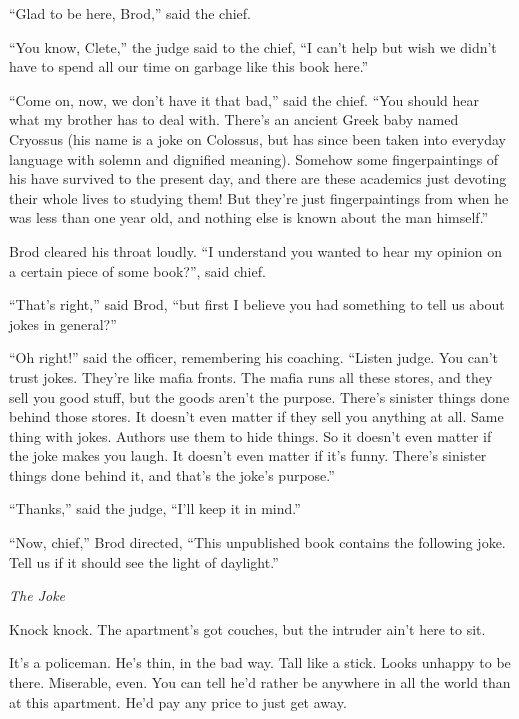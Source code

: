 \documentclass[oneside]{book}
\begin{document}
``Glad to be here, Brod,'' said the chief.

``You know, Clete,'' the judge said to the chief,
``I can't help but wish we didn't have to spend
all our time on garbage like this book here.''

``Come on, now, we don't have it that bad,'' said the chief.
``You should hear what my brother has to deal with.
There's an ancient Greek baby named Cryossus (his name is a joke
on Colossus, but has since been taken into everyday language with
solemn and dignified meaning).  Somehow some fingerpaintings of his
have survived to the present day, and there are these academics
just devoting their whole lives to studying them!  But they're just
fingerpaintings from when he was less than one year old, and
nothing else is known about the man himself.''

Brod cleared his throat loudly.
``I understand you wanted to hear my opinion on a certain
piece of some book?'', said chief.

``That's right,'' said Brod, ``but first I believe you had something to tell us about jokes in general?''

``Oh right!'' said the officer, remembering his coaching.  ``Listen judge.  You can't trust jokes.
They're like mafia fronts.  The mafia runs all these stores, and they sell you good stuff, but the goods aren't
the purpose.  There's sinister things done behind those stores.  It doesn't even matter if they
sell you anything at all.  Same thing with jokes.  Authors use them to hide things.  So it doesn't even matter
if the joke makes you laugh.  It doesn't even matter if it's funny.  There's sinister things done behind it,
and that's the joke's purpose.''

``Thanks,'' said the judge, ``I'll keep it in mind.''

``Now, chief,'' Brod directed, ``This unpublished book contains the following joke.  Tell us if it should
see the light of daylight.''

\vspace{2mm}
\noindent \textit{The Joke}
\vspace{2mm}

Knock knock.  The apartment's got couches, but the intruder ain't here to sit.

It's a policeman.  He's thin, in the bad way.
Tall like a stick.  Looks unhappy to be there.  Miserable, even.  You can tell he'd
rather be anywhere in all the world than at this apartment.  He'd pay any price to just
get away.
\end{document}
